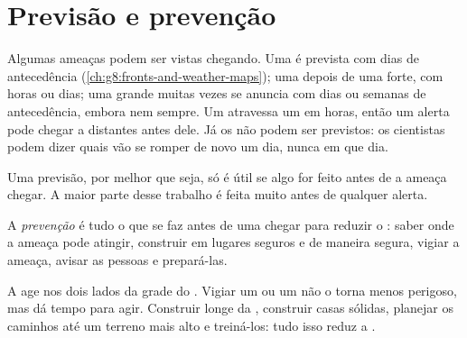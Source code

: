 \section{Previsão e prevenção}

Algumas ameaças podem ser vistas chegando. Uma  é prevista com
dias de antecedência (\cref{ch:g8:fronts-and-weather-maps}); uma
 depois de uma  forte, com horas ou dias; uma grande
 muitas vezes se anuncia com dias ou semanas de antecedência,
embora nem sempre. Um  atravessa um  em horas, então um
alerta pode chegar a  distantes antes dele. Já os  não
podem ser previstos: os cientistas podem dizer quais  vão se romper
de novo um dia, nunca em que dia.

Uma previsão, por melhor que seja, só é útil se algo for feito antes de
a ameaça chegar. A maior parte desse trabalho é feita muito antes de
qualquer alerta.

\begin{definition}[Prevenção]\label{def:g9:natural-risks:prevention}
A \emph{prevenção} é tudo o que se faz antes
de uma  chegar para reduzir o : saber onde a ameaça
pode atingir, construir em lugares seguros e de maneira segura, vigiar a
ameaça, avisar as pessoas e prepará-las.
\end{definition}

A  age nos dois lados da grade do . Vigiar um  ou um
 não o torna menos perigoso, mas dá tempo para agir. Construir longe
da , construir casas sólidas, planejar os caminhos
até um terreno mais alto e treiná-los: tudo isso reduz a .

